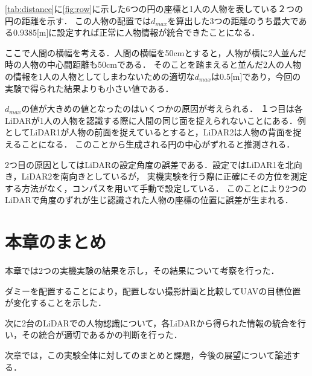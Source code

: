 \documentclass[autodetect-engine,dvipdfmx-if-dvi,ja=standard,a4j,jbase=11pt,magstyle=nomag*]{bxjsreport}
\begin{document}
\cref{tab:distance}に\cref{fig:row}に示した6つの円の座標と1人の人物を表している２つの円の距離を示す．
この人物の配置では$d_{max}$を算出した3つの距離のうち最大である0.9385[m]に設定すれば正常に人物情報が統合できたことになる．

ここで人間の横幅を考える．人間の横幅を50cmとすると，人物が横に2人並んだ時の人物の中心間距離も50cmである．
そのことを踏まえると並んだ2人の人物の情報を1人の人物としてしまわないための適切な$d_{max}$は0.5[m]であり，今回の実験で得られた結果よりも小さい値である．

$d_{max}$の値が大きめの値となったのはいくつかの原因が考えられる．
１つ目は各LiDARが1人の人物を認識する際に人間の同じ面を捉えられないことにある．例としてLiDAR1が人物の前面を捉えているとすると，LiDAR2は人物の背面を捉えることになる．
このことから生成される円の中心がずれると推測される．

2つ目の原因としてはLiDARの設定角度の誤差である．設定ではLiDAR1を北向き，LiDAR2を南向きとしているが，
実機実験を行う際に正確にその方位を測定する方法がなく，コンパスを用いて手動で設定している．
このことにより2つのLiDARで角度のずれが生じ認識された人物の座標の位置に誤差が生まれる．

\section{本章のまとめ}
本章では2つの実機実験の結果を示し，その結果について考察を行った．

ダミーを配置することにより，配置しない撮影計画と比較してUAVの目標位置が変化することを示した．

次に2台のLiDARでの人物認識について，各LiDARから得られた情報の統合を行い，その統合が適切であるかの判断を行った．

次章では，この実験全体に対してのまとめと課題，今後の展望について論述する．
\end{document}
